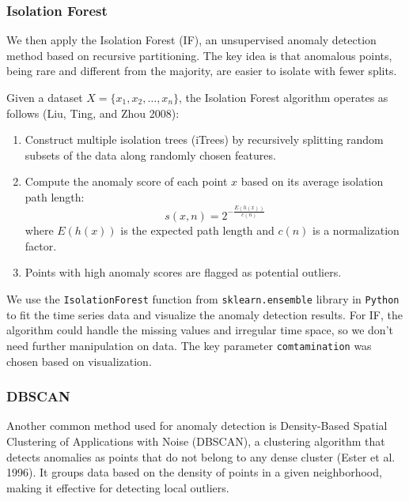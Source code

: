 \documentclass[
]{article}
\begin{document}
\subsubsection{Isolation Forest}\label{isolation-forest}

We then apply the Isolation Forest (IF), an unsupervised anomaly detection method based on recursive partitioning. The key idea is that anomalous points, being rare and different from the majority, are easier to isolate with fewer splits.

Given a dataset \(X = \{x_1, x_2, \dots, x_n\}\), the Isolation Forest algorithm operates as follows (Liu, Ting, and Zhou 2008):

\begin{enumerate}
    \item Construct multiple isolation trees (iTrees) by recursively splitting random subsets of the data along randomly chosen features.
    \item Compute the anomaly score of each point $x$ based on its average isolation path length:
    \begin{equation}
        s(x, n) = 2^{-\frac{E(h(x))}{c(n)}}
    \end{equation}
    where $E(h(x))$ is the expected path length and $c(n)$ is a normalization factor.
    \item Points with high anomaly scores are flagged as potential outliers.
\end{enumerate}

We use the \texttt{IsolationForest} function from \texttt{sklearn.ensemble} library in \texttt{Python} to fit the time series data and visualize the anomaly detection results. For IF, the algorithm could handle the missing values and irregular time space, so we don't need further manipulation on data. The key parameter \texttt{comtamination} was chosen based on visualization.

\subsubsection{DBSCAN}\label{dbscan}

Another common method used for anomaly detection is Density-Based Spatial Clustering of Applications with Noise (DBSCAN), a clustering algorithm that detects anomalies as points that do not belong to any dense cluster (Ester et al. 1996). It groups data based on the density of points in a given neighborhood, making it effective for detecting local outliers.
\end{document}
